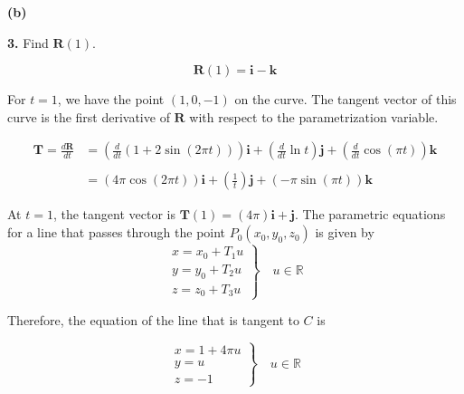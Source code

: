 \documentclass{article}
\begin{document}
\textbf{(b)}
\begin{center}
\end{center}

\newpage

\textbf{3.} Find $\mathbf{R}(1)$.

\[\mathbf{R}(1)=\mathbf{i}-\mathbf{k}\]

For $t=1$, we have the point $(1,0,-1)$ on the curve. The tangent vector of this curve is the first derivative of $\mathbf{R}$ with respect to the parametrization variable.

\begin{align*}\mathbf{T}=\frac{d\mathbf R}{dt}&=\left(\frac d{dt}\left(1+2\sin(2\pi t)\right)\right)\mathbf{i}+\left(\frac d{dt}\ln t\right)\mathbf{j}+\left(\frac d{dt}\cos(\pi t)\right)\mathbf{k}\\\\&=(4\pi\cos(2\pi t))\mathbf{i}+\left(\frac1t\right)\mathbf{j}+(-\pi\sin(\pi t))\mathbf{k}\end{align*}

At $t=1$, the tangent vector is $\mathbf{T}(1)=\left(4\pi\right)\mathbf{i}+\mathbf{j}$. The parametric equations for a line that passes through the point $P_0(x_0,y_0,z_0)$ is given by
\[\left.\begin{array}{c}
x=x_0+T_1u\\
y=y_0+T_2u\\
z=z_0+T_3u
\end{array}\right\}\quad u\in\mathbb{R}\]

Therefore, the equation of the line that is tangent to $C$ is

\[\boxed{\left.\begin{array}{l}
x=1+4\pi u\\
y=u\\
z=-1
\end{array}\right\}\quad u\in\mathbb{R}}\]

\vspace{1em}
\end{document}
